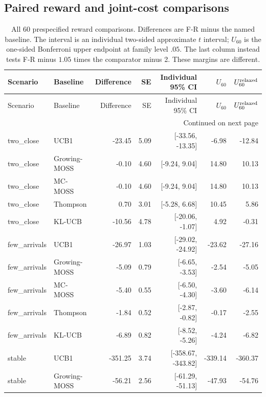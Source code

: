 \documentclass[11pt]{article}
\theoremstyle{remark}
\begin{document}
\subsection{Paired reward and joint-cost comparisons}
\begingroup
\fontsize{7.5}{9.5}\selectfont
\setlength{\tabcolsep}{4pt}
\begin{longtable}{llrrrrr}
\caption{All 60 prespecified reward comparisons. Differences are F-R minus the named baseline. The interval is an individual two-sided approximate $t$ interval; $U_{60}$ is the one-sided Bonferroni upper endpoint at family level $.05$. The last column instead tests F-R minus $1.05$ times the comparator minus 2. These margins are different.}\label{tab:reward-paired-full}\\
\toprule
Scenario & Baseline & Difference & SE & Individual 95\% CI & $U_{60}$ & $U_{60}^{\rm relaxed}$ \\
\midrule
\endfirsthead
\toprule
Scenario & Baseline & Difference & SE & Individual 95\% CI & $U_{60}$ & $U_{60}^{\rm relaxed}$ \\
\midrule
\endhead
\midrule
\multicolumn{7}{r}{Continued on next page}\\
\endfoot
\bottomrule
\endlastfoot
two\_close & UCB1 & -23.45 & 5.09 & [-33.56, -13.35] & -6.98 & -12.84 \\
two\_close & Growing-MOSS & -0.10 & 4.60 & [-9.24, 9.04] & 14.80 & 10.13 \\
two\_close & MC-MOSS & -0.10 & 4.60 & [-9.24, 9.04] & 14.80 & 10.13 \\
two\_close & Thompson & 0.70 & 3.01 & [-5.28, 6.68] & 10.45 & 5.86 \\
two\_close & KL-UCB & -10.56 & 4.78 & [-20.06, -1.07] & 4.92 & -0.31 \\
few\_arrivals & UCB1 & -26.97 & 1.03 & [-29.02, -24.92] & -23.62 & -27.16 \\
few\_arrivals & Growing-MOSS & -5.09 & 0.79 & [-6.65, -3.53] & -2.54 & -5.05 \\
few\_arrivals & MC-MOSS & -5.40 & 0.55 & [-6.50, -4.30] & -3.60 & -6.14 \\
few\_arrivals & Thompson & -1.84 & 0.52 & [-2.87, -0.82] & -0.17 & -2.55 \\
few\_arrivals & KL-UCB & -6.89 & 0.82 & [-8.52, -5.26] & -4.24 & -6.82 \\
stable & UCB1 & -351.25 & 3.74 & [-358.67, -343.82] & -339.14 & -360.37 \\
stable & Growing-MOSS & -56.21 & 2.56 & [-61.29, -51.13] & -47.93 & -54.76 \\

\end{longtable}
\end{document}
